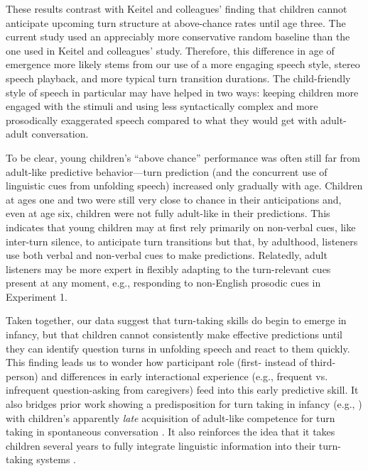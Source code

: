 \documentclass[authoryear, 12pt]{elsarticle}
\begin{document}
These results contrast with Keitel and colleagues' \citeyearpar{keitel2013} finding that children cannot anticipate upcoming turn structure at above-chance rates until age three. The current study used an appreciably more conservative random baseline than the one used in Keitel and colleagues' study. Therefore, this difference in age of emergence more likely stems from our use of a more engaging speech style, stereo speech playback, and more typical turn transition durations. The child-friendly style of speech in particular may have helped in two ways: keeping children more engaged with the stimuli and using less syntactically complex and more prosodically exaggerated speech \citep{fernald1989, werker1989, snow1977} compared to what they would get with adult-adult conversation.

To be clear, young children's ``above chance'' performance was often still far from adult-like predictive behavior---turn prediction (and the concurrent use of linguistic cues from unfolding speech) increased only gradually with age. Children at ages one and two were still very close to chance in their anticipations and, even at age six, children were not fully adult-like in their predictions. This indicates that young children may at first rely primarily on non-verbal cues, like inter-turn silence, to anticipate turn transitions but that, by adulthood, listeners use both verbal and non-verbal cues to make predictions. Relatedly, adult listeners may be more expert in flexibly adapting to the turn-relevant cues present at any moment, e.g., responding to non-English prosodic cues in Experiment 1.

Taken together, our data suggest that turn-taking skills do begin to emerge in infancy, but that children cannot consistently make effective predictions until they can identify question turns in unfolding speech and react to them quickly. This finding leads us to wonder how participant role (first- instead of third-person) and differences in early interactional experience (e.g., frequent vs. infrequent question-asking from caregivers) feed into this early predictive skill. It also bridges prior work showing a predisposition for turn taking in infancy (e.g., \citealp{bateson1975, hilbrink2015, jaffe2001, snow1977}) with children's apparently \textit{late} acquisition of adult-like competence for turn taking in spontaneous conversation \citep{casillas2016, garvey1984, garvey1981, ervin-tripp1979}. It also reinforces the idea that it takes children several years to fully integrate linguistic information into their turn-taking systems \citep{casillas2016,garvey1981}.
\end{document}
